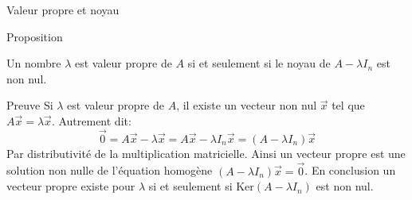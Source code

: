     \begin{parag}{Valeur propre et noyau}
        \begin{subparag}{Proposition}
        \begin{proposition}
            Un nombre $\lambda$ est valeur propre de $A$ si et seulement si le noyau de $A - \lambda I_n$ est non nul.
        \end{proposition}
        \end{subparag}
        
        \begin{subparag}{Preuve}
            Si $\lambda$ est valeur propre de $A$, il existe un vecteur non nul $\vec{x}$ tel que $A\vec{x} = \lambda \vec{x}$. Autrement dit:
            \[\vec{0} = A\vec{x} - \lambda \vec{x} =  A\vec{x} - \lambda I_n\vec{x} = (A - \lambda I_n)\vec{x}\]
            Par distributivité de la multiplication matricielle. Ainsi un vecteur propre est une solution non nulle de l'équation homogène $(A - \lambda I_n)\vec{x} = \vec{0}$. En conclusion un vecteur propre existe pour $\lambda$ si et seulement si Ker$(A - \lambda I_n)$ est non nul.
        \end{subparag}
    \end{parag}

    







